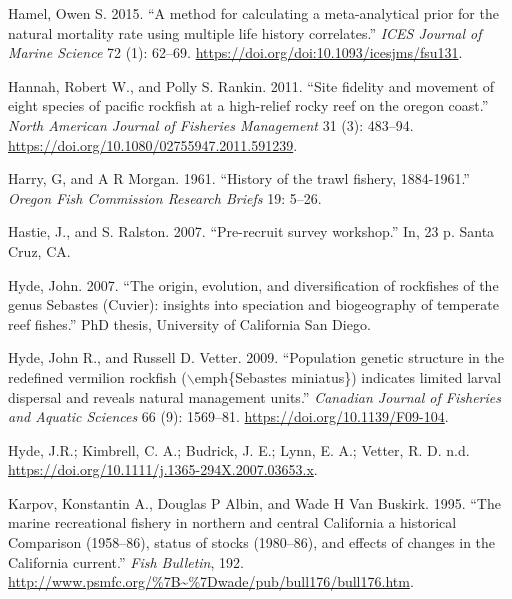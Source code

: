 \documentclass[
  english,
  a4paper,
]{article}
\newlength{\cslhangindent}
\newlength{\cslentryspacingunit} %
\newenvironment{CSLReferences}[2] %
 {%
  \setlength{\parindent}{0pt}
  \ifodd #1
  \let\oldpar\par
  \def\par{\hangindent=\cslhangindent\oldpar}
  \fi
  \setlength{\parskip}{#2\cslentryspacingunit}
 }%
 {}
\begin{document}
\begin{CSLReferences}{1}{0}
\leavevmode{}%
Hamel, Owen S. 2015. {``{A method for calculating a meta-analytical prior for the natural mortality rate using multiple life history correlates}.''} \emph{ICES Journal of Marine Science} 72 (1): 62--69. \url{https://doi.org/doi:10.1093/icesjms/fsu131}.

\leavevmode{}%
Hannah, Robert W., and Polly S. Rankin. 2011. {``{Site fidelity and movement of eight species of pacific rockfish at a high-relief rocky reef on the oregon coast}.''} \emph{North American Journal of Fisheries Management} 31 (3): 483--94. \url{https://doi.org/10.1080/02755947.2011.591239}.

\leavevmode{}%
Harry, G, and A R Morgan. 1961. {``{History of the trawl fishery, 1884-1961}.''} \emph{Oregon Fish Commission Research Briefs} 19: 5--26.

\leavevmode{}%
Hastie, J., and S. Ralston. 2007. {``{Pre-recruit survey workshop}.''} In, 23 p. Santa Cruz, CA.

\leavevmode{}%
Hyde, John. 2007. {``{The origin, evolution, and diversification of rockfishes of the genus Sebastes (Cuvier): insights into speciation and biogeography of temperate reef fishes}.''} PhD thesis, University of California San Diego.

\leavevmode{}%
Hyde, John R., and Russell D. Vetter. 2009. {``{Population genetic structure in the redefined vermilion rockfish (\(\backslash\)emph{\{}Sebastes miniatus{\}}) indicates limited larval dispersal and reveals natural management units}.''} \emph{Canadian Journal of Fisheries and Aquatic Sciences} 66 (9): 1569--81. \url{https://doi.org/10.1139/F09-104}.

\leavevmode{}%
Hyde, J.R.; Kimbrell, C. A.; Budrick, J. E.; Lynn, E. A.; Vetter, R. D. n.d. \url{https://doi.org/10.1111/j.1365-294X.2007.03653.x}.

\leavevmode{}%
Karpov, Konstantin A., Douglas P Albin, and Wade H Van Buskirk. 1995. {``{The marine recreational fishery in northern and central California a historical Comparison (1958--86), status of stocks (1980--86), and effects of changes in the California current}.''} \emph{Fish Bulletin}, 192. \url{http://www.psmfc.org/\%7B~\%7Dwade/pub/bull176/bull176.htm}.


\end{CSLReferences}
\end{document}

